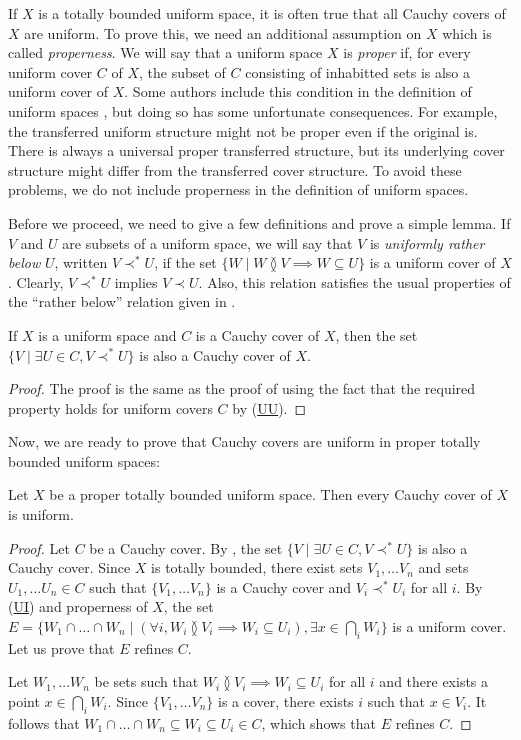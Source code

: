 \documentclass[reqno]{amsart}
\newcommand{\axref}[1]{(\hyperref[ax:#1]{#1})}
\theoremstyle{definition}
\theoremstyle{remark}
\numberwithin{figure}{section}
\newcommand{\overlap}[2]{#1 \between #2}
\newcommand{\rb}{\prec}
\begin{document}
If $X$ is a totally bounded uniform space, it is often true that all Cauchy covers of $X$ are uniform.
To prove this, we need an additional assumption on $X$ which is called \emph{properness}.
We will say that a uniform space $X$ is \emph{proper} if, for every uniform cover $C$ of $X$, the subset of $C$ consisting of inhabitted sets is also a uniform cover of $X$.
Some authors include this condition in the definition of uniform spaces \cite{uniform-locales}, but doing so has some unfortunate consequences.
For example, the transferred uniform structure might not be proper even if the original is.
There is always a universal proper transferred structure, but its underlying cover structure might differ from the transferred cover structure.
To avoid these problems, we do not include properness in the definition of uniform spaces.

Before we proceed, we need to give a few definitions and prove a simple lemma.
If $V$ and $U$ are subsets of a uniform space, we will say that $V$ is \emph{uniformly rather below} $U$,
written $V \rb^* U$, if the set $\{ W \mid \overlap{W}{V} \implies W \subseteq U \}$ is a uniform cover of $X$.
Clearly, $V \rb^* U$ implies $V \rb U$.
Also, this relation satisfies the usual properties of the ``rather below'' relation given in .

\begin{lem}
If $X$ is a uniform space and $C$ is a Cauchy cover of $X$, then the set $\{ V \mid \exists U \in C, V \rb^* U \}$ is also a Cauchy cover of $X$.
\end{lem}
\begin{proof}
The proof is the same as the proof of  using the fact that the required property holds for uniform covers $C$ by \axref{UU}.
\end{proof}

Now, we are ready to prove that Cauchy covers are uniform in proper totally bounded uniform spaces:

\begin{prop}[tb-cauchy]
Let $X$ be a proper totally bounded uniform space.
Then every Cauchy cover of $X$ is uniform.
\end{prop}
\begin{proof}
Let $C$ be a Cauchy cover.
By , the set $\{ V \mid \exists U \in C, V \rb^* U \}$ is also a Cauchy cover.
Since $X$ is totally bounded, there exist sets $V_1, \ldots V_n$ and sets $U_1, \ldots U_n \in C$ such that $\{ V_1, \ldots V_n \}$ is a Cauchy cover and $V_i \rb^* U_i$ for all $i$.
By \axref{UI} and properness of $X$, the set $E = \{ W_1 \cap \ldots \cap W_n \mid (\forall i, \overlap{W_i}{V_i} \implies W_i \subseteq U_i), \exists x \in \bigcap_i W_i \}$ is a uniform cover.
Let us prove that $E$ refines $C$.

Let $W_1, \ldots W_n$ be sets such that $\overlap{W_i}{V_i} \implies W_i \subseteq U_i$ for all $i$ and there exists a point $x \in \bigcap_i W_i$.
Since $\{ V_1, \ldots V_n \}$ is a cover, there exists $i$ such that $x \in V_i$.
It follows that $W_1 \cap \ldots \cap W_n \subseteq W_i \subseteq U_i \in C$, which shows that $E$ refines $C$.
\end{proof}
\end{document}
